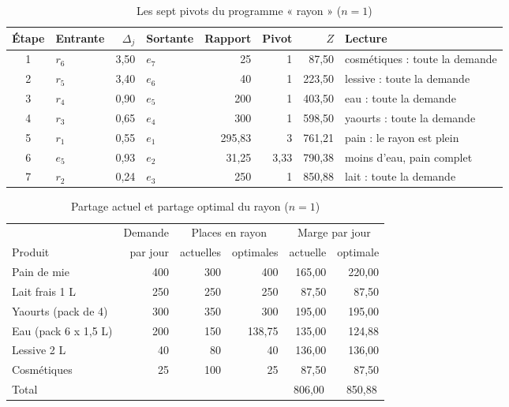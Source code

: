 \documentclass[11pt,a4paper]{article}
\newcommand{\eur}{\,\text{€}}
\begin{document}
\begin{table}[!htbp]
\centering\small
\caption{Les sept pivots du programme « rayon » ($n = 1$)}\label{tab:pivotsrayon}
\begin{tabular}{@{}clrlrrrl@{}}
\toprule
Étape & Entrante & $\Delta_j$ & Sortante & Rapport & Pivot & $Z$ & Lecture \\
\midrule
1 & $r_6$ & 3,50 & $e_7$ & 25 & 1 & 87,50 & cosmétiques : toute la demande \\
2 & $r_5$ & 3,40 & $e_6$ & 40 & 1 & 223,50 & lessive : toute la demande \\
3 & $r_4$ & 0,90 & $e_5$ & 200 & 1 & 403,50 & eau : toute la demande \\
4 & $r_3$ & 0,65 & $e_4$ & 300 & 1 & 598,50 & yaourts : toute la demande \\
5 & $r_1$ & 0,55 & $e_1$ & 295,83 & 3 & 761,21 & pain : le rayon est plein \\
6 & $e_5$ & 0,93 & $e_2$ & 31,25 & 3,33 & 790,38 & moins d'eau, pain complet \\
7 & $r_2$ & 0,24 & $e_3$ & 250 & 1 & 850,88 & lait : toute la demande \\
\bottomrule
\end{tabular}
\end{table}

\begin{table}[!htbp]
\centering\small
\caption{Partage actuel et partage optimal du rayon ($n = 1$)}\label{tab:rayon}
\begin{tabular}{@{}lrrrrr@{}}
\toprule
 & Demande & \multicolumn{2}{c}{Places en rayon} & \multicolumn{2}{c}{Marge par jour} \\
\cmidrule(lr){3-4}\cmidrule(lr){5-6}
Produit & par jour & actuelles & optimales & actuelle & optimale \\
\midrule
Pain de mie          & 400 & 300 & 400    & 165,00 & 220,00 \\
Lait frais 1 L       & 250 & 250 & 250    & 87,50  & 87,50 \\
Yaourts (pack de 4)  & 300 & 350 & 300    & 195,00 & 195,00 \\
Eau (pack 6 x 1,5 L) & 200 & 150 & 138,75 & 135,00 & 124,88 \\
Lessive 2 L          & 40  & 80  & 40     & 136,00 & 136,00 \\
Cosmétiques          & 25  & 100 & 25     & 87,50  & 87,50 \\
\midrule
Total                &     &     &        & 806,00\eur & 850,88\eur \\
\bottomrule
\end{tabular}
\end{table}
\end{document}
